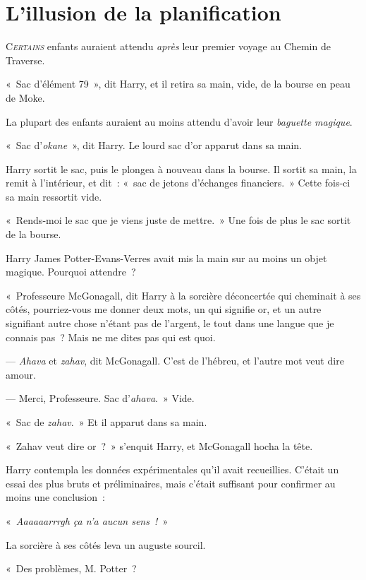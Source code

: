 \chapter{L'illusion de la planification}

\lettrine{C}{\emph{ertains}} enfants auraient attendu \emph{après} leur premier voyage au Chemin de Traverse.

«~Sac d'élément 79~», dit Harry, et il retira sa main, vide, de la bourse en peau de Moke.

La plupart des enfants auraient au moins attendu d'avoir leur \emph{baguette magique}.

«~Sac d'\emph{okane}~», dit Harry. Le lourd sac d'or apparut dans sa main.

Harry sortit le sac, puis le plongea à nouveau dans la bourse. Il sortit sa main, la remit à l'intérieur, et dit~: «~sac de jetons d'échanges financiers.~» Cette fois-ci sa main ressortit vide.

«~Rends-moi le sac que je viens juste de mettre.~» Une fois de plus le sac sortit de la bourse.

Harry James Potter-Evans-Verres avait mis la main sur au moins un objet magique. Pourquoi attendre~?

«~Professeure McGonagall, dit Harry à la sorcière déconcertée qui cheminait à ses côtés, pourriez-vous me donner deux mots, un qui signifie or, et un autre signifiant autre chose n'étant pas de l'argent, le tout dans une langue que je connais pas~? Mais ne me dites pas qui est quoi.

--- \emph{Ahava} et \emph{zahav}, dit McGonagall. C'est de l'hébreu, et l'autre mot veut dire amour.

--- Merci, Professeure. Sac d'\emph{ahava}.~» Vide.

«~Sac de \emph{zahav}.~» Et il apparut dans sa main.

«~Zahav veut dire or~?~» s'enquit Harry, et McGonagall hocha la tête.

Harry contempla les données expérimentales qu'il avait recueillies.
C'était un essai des plus bruts et préliminaires, mais c'était suffisant pour confirmer au moins une conclusion~:

«~\emph{Aaaaaarrrgh ça n'a aucun sens~!}~»

La sorcière à ses côtés leva un auguste sourcil.

«~Des problèmes, M. Potter~?

